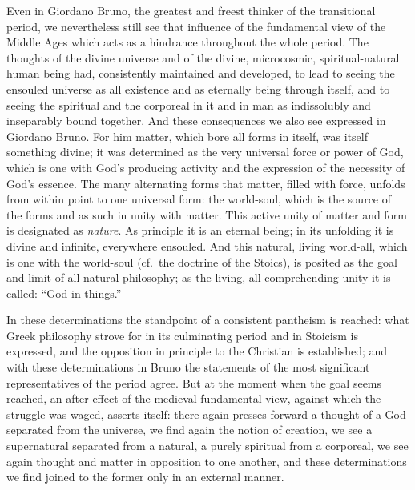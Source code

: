 Even in Giordano Bruno, the greatest and freest thinker of the
transitional period, we nevertheless still see that influence of the
fundamental view of the Middle Ages which acts as a hindrance throughout
the whole period. The thoughts of the divine universe and of the divine,
microcosmic, spiritual-natural human being had, consistently maintained
and developed, to lead to seeing the ensouled universe as all existence
and as eternally being through itself, and to seeing the spiritual and
the corporeal in it and in man as indissolubly and inseparably bound
together. And these consequences we also see expressed in Giordano
Bruno. For him matter, which bore all forms in itself, was itself
something divine; it was determined as the very universal force or power
of God, which is one with God's producing activity and the expression of
the necessity of God's essence. The many alternating forms that matter,
filled with force, unfolds from within point to one universal form: the
world-soul, which is the source of the forms and as such in unity with
matter. This active unity of matter and form is designated as
\emph{nature}. As principle it is an eternal being; in its unfolding it
is divine and infinite, everywhere ensouled. And this natural, living
world-all, which is one with the world-soul (cf.\ the doctrine of the
Stoics), is posited as the goal and limit of all natural philosophy; as
the living, all-comprehending unity it is called: ``God in things.''

In these determinations the standpoint of a consistent pantheism is
reached: what Greek philosophy strove for in its culminating period and
in Stoicism is expressed, and the opposition in principle to the
Christian is established; and with these determinations in Bruno the
statements of the most significant representatives of the period agree.
But at the moment when the goal seems reached, an after-effect of the
medieval fundamental view, against which the struggle was waged, asserts
itself: there again presses forward a thought of a God separated from
the universe, we find again the notion of creation, we see a
supernatural separated from a natural, a purely spiritual from a
corporeal, we see again thought and matter in opposition to one another,
and these determinations we find joined to the former only in an
external manner.

